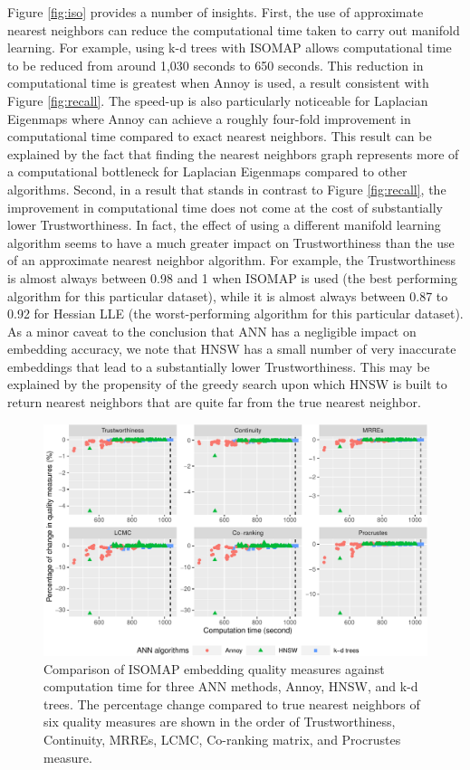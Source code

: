 \documentclass[11pt,a4paper,]{article}
\begin{document}
Figure \ref{fig:iso} provides a number of insights. First, the use of approximate nearest neighbors can reduce the computational time taken to carry out manifold learning. For example, using k-d trees with ISOMAP allows computational time to be reduced from around 1,030 seconds to 650 seconds. This reduction in computational time is greatest when Annoy is used, a result consistent with Figure \ref{fig:recall}. The speed-up is also particularly noticeable for Laplacian Eigenmaps where Annoy can achieve a roughly four-fold improvement in computational time compared to exact nearest neighbors. This result can be explained by the fact that finding the nearest neighbors graph represents more of a computational bottleneck for Laplacian Eigenmaps compared to other algorithms. Second, in a result that stands in contrast to Figure \ref{fig:recall}, the improvement in computational time does not come at the cost of substantially lower Trustworthiness. In fact, the effect of using a different manifold learning algorithm seems to have a much greater impact on Trustworthiness than the use of an approximate nearest neighbor algorithm. For example, the Trustworthiness is almost always between 0.98 and 1 when ISOMAP is used (the best performing algorithm for this particular dataset), while it is almost always between 0.87 to 0.92 for Hessian LLE (the worst-performing algorithm for this particular dataset). As a minor caveat to the conclusion that ANN has a negligible impact on embedding accuracy, we note that HNSW has a small number of very inaccurate embeddings that lead to a substantially lower Trustworthiness. This may be explained by the propensity of the greedy search upon which HNSW is built to return nearest neighbors that are quite far from the true nearest neighbor.

\begin{figure}

{\centering \includegraphics[width=1\linewidth]{mlann_ebs_files/figure-latex/iso6measure-1} 

}

\caption{Comparison of ISOMAP embedding quality measures against computation time for three ANN methods, Annoy, HNSW, and k-d trees. The percentage change compared to true nearest neighbors of six quality measures are shown in the order of Trustworthiness, Continuity, MRREs, LCMC, Co-ranking matrix, and Procrustes measure. }\label{fig:iso6measure}
\end{figure}
\end{document}
